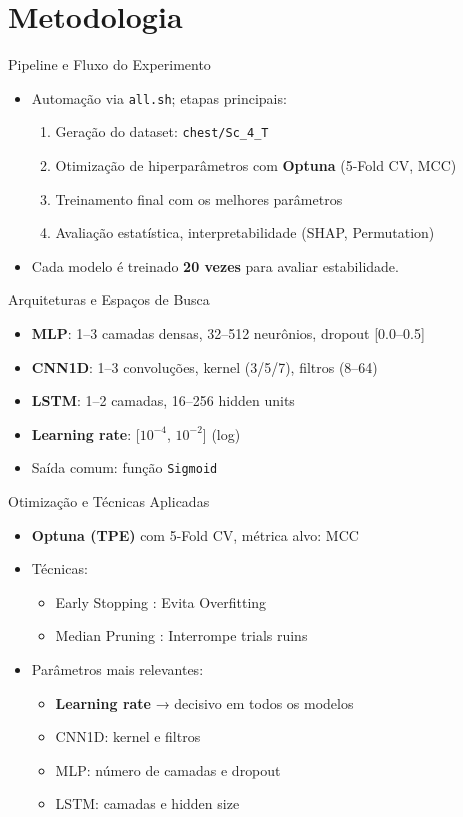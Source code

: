 \documentclass[10pt]{beamer}
\begin{document}
\section{Metodologia}

\begin{frame}{Pipeline e Fluxo do Experimento}
  \begin{itemize}
    \item Automação via \texttt{all.sh}; etapas principais:
    \begin{enumerate}
      \item Geração do dataset: \texttt{chest/Sc\_4\_T}
      \item Otimização de hiperparâmetros com \textbf{Optuna} (5-Fold CV, MCC)
      \item Treinamento final com os melhores parâmetros
      \item Avaliação estatística, interpretabilidade (SHAP, Permutation)
    \end{enumerate}
    \item Cada modelo é treinado \textbf{20 vezes} para avaliar estabilidade.
  \end{itemize}
\end{frame}

\begin{frame}{Arquiteturas e Espaços de Busca}
  \begin{itemize}
    \item \textbf{MLP}: 1–3 camadas densas, 32–512 neurônios, dropout [0.0–0.5]
    \item \textbf{CNN1D}: 1–3 convoluções, kernel (3/5/7), filtros (8–64)
    \item \textbf{LSTM}: 1–2 camadas, 16–256 hidden units
    \item \textbf{Learning rate}: [$10^{-4}$, $10^{-2}$] (log)
    \item Saída comum: função \texttt{Sigmoid}
  \end{itemize}
\end{frame}

\begin{frame}{Otimização e Técnicas Aplicadas}
  \begin{itemize}
    \item \textbf{Optuna (TPE)} com 5-Fold CV, métrica alvo: MCC
    \item Técnicas:
    \begin{itemize}
      \item Early Stopping : Evita Overfitting
      \item Median Pruning : Interrompe trials ruins
    \end{itemize}
    \item Parâmetros mais relevantes:
    \begin{itemize}
      \item \textbf{Learning rate} → decisivo em todos os modelos
      \item CNN1D: kernel e filtros
      \item MLP: número de camadas e dropout
      \item LSTM: camadas e hidden size
    \end{itemize}
  \end{itemize}
\end{frame}
\end{document}
